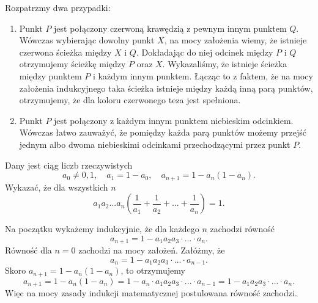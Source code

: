 Rozpatrzmy dwa przypadki:
\begin{enumerate}
	\item Punkt $P$ jest połączony czerwoną krawędzią z pewnym innym punktem $Q$. Wówczas wybierając dowolny punkt $X$, na mocy założenia wiemy, że istnieje czerwona ścieżka między $X$ i $Q$. Dokładając do niej odcinek między $P$ i $Q$ otrzymujemy ścieżkę między $P$ oraz $X$.
	Wykazaliśmy, że istnieje ścieżka między punktem $P$ i każdym innym punktem. Łącząc to z faktem, że na mocy założenia indukcyjnego taka ścieżka istnieje między każdą inną parą punktów, otrzymujemy, że dla koloru czerwonego teza jest spełniona.
	\item Punkt $P$ jest połączony z każdym innym punktem niebieskim odcinkiem. Wówczas łatwo zauważyć, że pomiędzy każda parą punktów możemy przejść jednym albo dwoma niebieskimi odcinkami przechodzącymi przez punkt $P$.
\end{enumerate}

\begin{problem}{5}
Dany jest ciąg liczb rzeczywistych
\[
	a_0 \neq 0, 1,\quad a_1 = 1 - a_0,\quad a_{n + 1} = 1 - a_n(1 - a_n). 
\]
Wykazać, że dla wszystkich $n$ 
\[
	a_1a_2...a_n\left(\frac{1}{a_1} + \frac{1}{a_2} + ... + \frac{1}{a_n}\right) = 1.
\]
\end{problem}

\noindent
Na początku wykażemy indukcyjnie, że dla każdego $n$ zachodzi równość
\[
	a_{n + 1} = 1 - a_1a_2a_3\cdot ... \cdot a_{n}.
\]
Równość dla $n = 0$ zachodzi na mocy założeń.
Załóżmy, że
\[
	a_{n} = 1 - a_1a_2a_3\cdot ... \cdot a_{n - 1}.
\]
Skoro $a_{n + 1} = 1 - a_n(1 - a_n)$, to otrzymujemy
\[
	a_{n + 1} = 1 - a_n(1 - a_n) = 1 - a_n \cdot a_1a_2a_3\cdot ... \cdot a_{n - 1} = 1 - a_1a_2a_3\cdot ... \cdot a_{n}.
\]
Więc na mocy zasady indukcji matematycznej postulowana równość zachodzi.
\vspace{10px}

